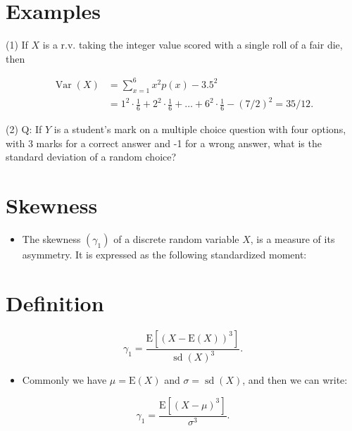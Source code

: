 \documentclass[10pt]{article}
\begin{document}
\section*{Examples}
(1) If $X$ is a r.v. taking the integer value scored with a single roll of a fair die, then

$$
\begin{aligned}
\operatorname{Var}(X) & =\sum_{x=1}^{6} x^{2} p(x)-3.5^{2} \\
& =1^{2} \cdot \frac{1}{6}+2^{2} \cdot \frac{1}{6}+\ldots+6^{2} \cdot \frac{1}{6}-(7 / 2)^{2}=35 / 12 .
\end{aligned}
$$

(2) Q: If $Y$ is a student's mark on a multiple choice question with four options, with 3 marks for a correct answer and -1 for a wrong answer, what is the standard deviation of a random choice?

\section*{Skewness}
\begin{itemize}
  \item The skewness $\left(\gamma_{1}\right)$ of a discrete random variable $X$, is a measure of its asymmetry. It is expressed as the following standardized moment:
\end{itemize}

\section*{Definition}
$$
\gamma_{1}=\frac{\mathrm{E}\left[(X-\mathrm{E}(X))^{3}\right]}{\operatorname{sd}(X)^{3}} .
$$

\begin{itemize}
  \item Commonly we have $\mu=\mathrm{E}(X)$ and $\sigma=\operatorname{sd}(X)$, and then we can write:
\end{itemize}

$$
\gamma_{1}=\frac{\mathrm{E}\left[(X-\mu)^{3}\right]}{\sigma^{3}} .
$$
\end{document}
